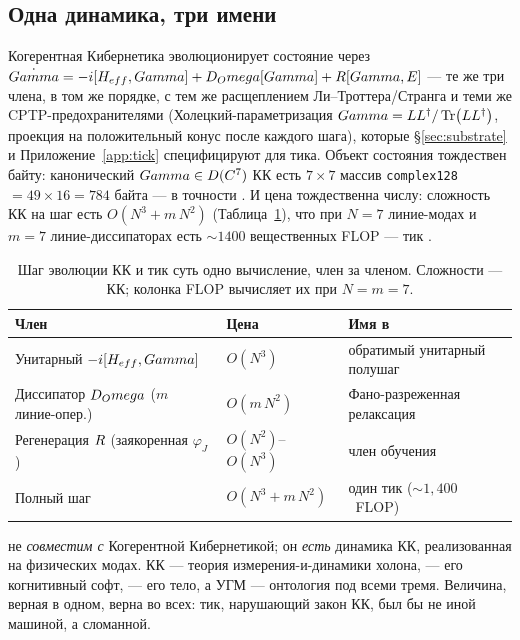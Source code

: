 \subsection{Одна динамика, три имени}
\label{subsec:one-dynamics}

Когерентная Кибернетика эволюционирует состояние через
$\dot{Gamma} = -i[H_{eff},Gamma] + D_Omega[Gamma] + R[Gamma,E]$ --- те же
три члена, в том же порядке, с тем же расщеплением Ли--Троттера/Странга и теми же
CPTP-предохранителями (Холецкий-параметризация $Gamma = LL^\dagger/\Tr(LL^\dagger)$,
проекция на положительный конус после каждого шага), которые
\S\ref{sec:substrate} и Приложение~\ref{app:tick} специфицируют для тика. Объект
состояния тождествен байту: канонический $Gamma\in D(C^7)$ КК есть
$7\times7$ массив \texttt{complex128} $=49\times16=784$ байта --- в точности
\DM{}. И цена тождественна числу: сложность КК на шаг есть $O(N^3 + m\,N^2)$
(Таблица~\ref{tab:cc-cost}), что при $N=7$ линие-модах и $m=7$ линие-диссипаторах
есть ${\sim}1400$ вещественных FLOP --- тик \TALOS{}.

\begin{table}[H]
\centering\small
\caption{Шаг эволюции КК и тик \TALOS{} суть одно вычисление, член за членом.
Сложности --- КК; колонка FLOP вычисляет их при $N=m=7$.}
\label{tab:cc-cost}
\begin{tabular}{@{}p{4.6cm}p{3.4cm}p{3.4cm}@{}}
\toprule
\textbf{Член} & \textbf{Цена} & \textbf{Имя в \TALOS{}} \\
\midrule
Унитарный $-i[H_{eff},Gamma]$ & $O(N^3)$ & обратимый унитарный полушаг \\
Диссипатор $D_Omega$ ($m$ линие-опер.) & $O(m\,N^2)$ & Фано-разреженная релаксация \\
Регенерация $R$ (заякоренная $\varphi_J$) & $O(N^2)$--$O(N^3)$ & член обучения \\
\midrule
Полный шаг & $O(N^3+m\,N^2)$ & один тик (${\sim}1{,}400$~FLOP) \\
\bottomrule
\end{tabular}
\end{table}

\begin{principle}\label{prin:cc-identity}
\TALOS{} не \emph{совместим с} Когерентной Кибернетикой; он \emph{есть} динамика
КК, реализованная на физических модах. КК --- теория измерения-и-динамики
холона, \SYNARC{} --- его когнитивный софт, \TALOS{} --- его тело, а УГМ ---
онтология под всеми тремя. Величина, верная в одном, верна во всех: тик,
нарушающий закон КК, был бы не иной машиной, а сломанной.
\end{principle}

